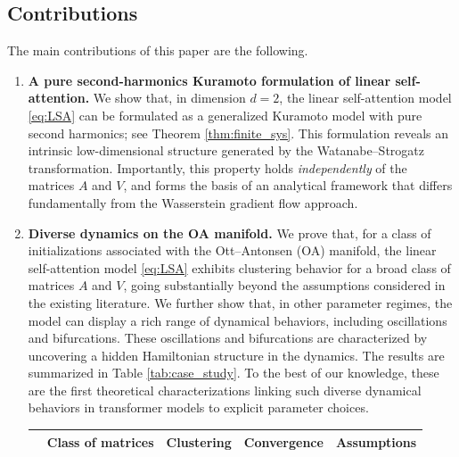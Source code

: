 \documentclass[10pt]{article}
\theoremstyle{definition}
\theoremstyle{definition}
\numberwithin{equation}{section}
\begin{document}
\subsection{Contributions}
The main contributions of this paper are the following.

\begin{enumerate}[label=\textup{(\roman*)}]
\item \textbf{A pure second-harmonics Kuramoto formulation of linear self-attention.}
We show that, in dimension $d=2$, the linear self-attention model \eqref{eq:LSA} can be formulated as a generalized Kuramoto model with pure second harmonics; see Theorem \ref{thm:finite_sys}.
This formulation reveals an intrinsic low-dimensional structure generated by the Watanabe--Strogatz transformation.
Importantly, this property holds \emph{independently} of the matrices $A$ and $V$,
and forms the basis of an analytical framework that differs fundamentally from the Wasserstein gradient flow approach.

\item \textbf{Diverse dynamics on the OA manifold.} We prove that, for a class of initializations associated with the Ott--Antonsen (OA) manifold, the linear self-attention model \eqref{eq:LSA} exhibits clustering behavior for a broad class of matrices $A$ and $V$, going substantially beyond the assumptions considered in the existing literature.
We further show that, in other parameter regimes, the model can display a rich range of dynamical behaviors, including oscillations and bifurcations.
These oscillations and bifurcations are characterized by uncovering a hidden Hamiltonian structure in the dynamics.
The results are summarized in Table \ref{tab:case_study}. 
To the best of our knowledge, these are the first theoretical characterizations linking such diverse dynamical behaviors in transformer models to explicit parameter choices. 
    
\begin{table}[!htb] 
\centering
\begin{threeparttable}
\renewcommand{\arraystretch}{1.5}
\begin{tabular}{>{\raggedright\arraybackslash}p{}
                >{\centering\arraybackslash}p{}%
                >{\centering\arraybackslash}p{}%
                >{\centering\arraybackslash}p{}%
                >{\centering\arraybackslash}p{}
                }
\toprule
\textbf{} & \textbf{Class of matrices} & \textbf{Clustering} & \textbf{Convergence} & \textbf{Assumptions} \\
\midrule


\end{tabular}
\end{threeparttable}
\end{table}
\end{enumerate}
\end{document}
